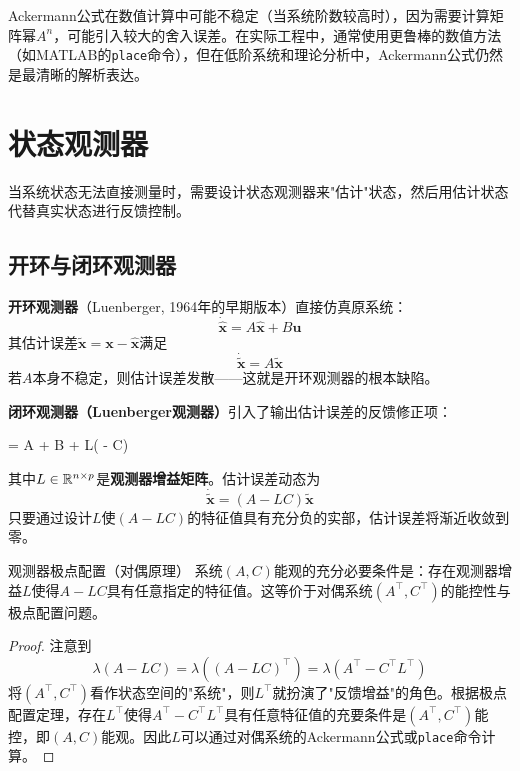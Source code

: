 \begin{remark}
Ackermann公式在数值计算中可能不稳定（当系统阶数较高时），因为需要计算矩阵幂$A^n$，可能引入较大的舍入误差。在实际工程中，通常使用更鲁棒的数值方法（如MATLAB的\texttt{place}命令），但在低阶系统和理论分析中，Ackermann公式仍然是最清晰的解析表达。
\end{remark}

\section{状态观测器}

当系统状态无法直接测量时，需要设计状态观测器来"估计"状态，然后用估计状态代替真实状态进行反馈控制。

\subsection{开环与闭环观测器}

\textbf{开环观测器}（Luenberger, 1964年的早期版本）直接仿真原系统：
\[
\dot{\hat{\mathbf{x}}} = A\hat{\mathbf{x}} + B\mathbf{u}
\]
其估计误差$\tilde{\mathbf{x}} = \mathbf{x} - \hat{\mathbf{x}}$满足
\[
\dot{\tilde{\mathbf{x}}} = A\tilde{\mathbf{x}}
\]
若$A$本身不稳定，则估计误差发散——这就是开环观测器的根本缺陷。

\textbf{闭环观测器（Luenberger观测器）}引入了输出估计误差的反馈修正项：
\begin{myformula}
 = A + B + L( - C)
\end{myformula}
其中$L \in \mathbb{R}^{n \times p}$是\textbf{观测器增益矩阵}。估计误差动态为
\[
\dot{\tilde{\mathbf{x}}} = (A - LC)\tilde{\mathbf{x}}
\]
只要通过设计$L$使$(A-LC)$的特征值具有充分负的实部，估计误差将渐近收敛到零。

\begin{myTheorem}{观测器极点配置（对偶原理）}
系统$(A, C)$能观的充分必要条件是：存在观测器增益$L$使得$A-LC$具有任意指定的特征值。这等价于对偶系统$(A^{\top}, C^{\top})$的能控性与极点配置问题。
\end{myTheorem}

\begin{proof}
注意到
\[
\lambda(A - LC) = \lambda((A - LC)^{\top}) = \lambda(A^{\top} - C^{\top}L^{\top})
\]
将$(A^{\top}, C^{\top})$看作状态空间的"系统"，则$L^{\top}$就扮演了"反馈增益"的角色。根据极点配置定理，存在$L^{\top}$使得$A^{\top} - C^{\top}L^{\top}$具有任意特征值的充要条件是$(A^{\top}, C^{\top})$能控，即$(A, C)$能观。因此$L$可以通过对偶系统的Ackermann公式或\texttt{place}命令计算。
\end{proof}

